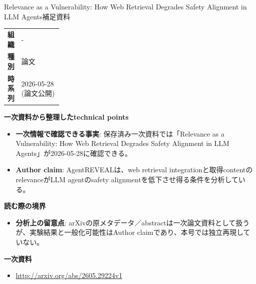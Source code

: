 \begin{technicalnote}{Relevance as a Vulnerability: How Web Retrieval Degrades Safety Alignment in LLM Agents}{補足資料}
\begingroup
\begin{tabularx}{\linewidth}{@{}>{\bfseries}p{0.22\linewidth}X@{}}
組織 & - \\
種別 & 論文 \\
時系列 & 2026-05-28 (論文公開) \\
\end{tabularx}
\smallskip
{\bfseries 一次資料から整理したtechnical points}
\begin{itemize}[leftmargin=1.5em,itemsep=0.35em]
\item \textbf{一次情報で確認できる事実}: 保存済み一次資料では「Relevance as a Vulnerability: How Web Retrieval Degrades Safety Alignment in LLM Agents」が2026-05-28に確認できる。
\item \textbf{Author claim}: AgentREVEALは、web retrieval integrationと取得contentのrelevanceがLLM agentのsafety alignmentを低下させ得る条件を分析している。
\end{itemize}
{\bfseries 読む際の境界}
\begin{itemize}[leftmargin=1.5em,itemsep=0.35em]
\item \textbf{分析上の留意点}: arXivの原メタデータ／abstractは一次論文資料として扱うが、実験結果と一般化可能性はAuthor claimであり、本号では独立再現していない。
\end{itemize}
\begin{samepage}
{\bfseries 一次資料}
\begingroup\sloppy
\begin{itemize}[leftmargin=1.5em,itemsep=0.25em]
\item {\scriptsize\url{http://arxiv.org/abs/2605.29224v1}}
\end{itemize}
\endgroup
\end{samepage}
\endgroup
\end{technicalnote}
\medskip

